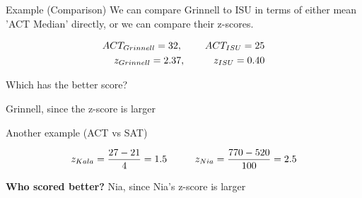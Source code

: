\documentclass{beamer}
\begin{document}
\begin{frame}{Example (Comparison)}
We can compare Grinnell to ISU in terms of either mean 'ACT Median' directly, or we can compare their z-scores.

\begin{center}
\begin{align*}
ACT_{Grinnell} = 32, \hspace{8mm} ACT_{ISU} = 25\\
z_{Grinnell} = 2.37, \hspace{10mm} z_{ISU} = 0.40
\end{align*} 
\end{center}
Which has the better score? 

Grinnell, since the z-score is larger
\end{frame}



\begin{frame}{Another example (ACT vs SAT)}

\noindent{} \vspace{4mm}

\begin{equation*}
    z_{Kala}=\frac{27-21}{4} = 1.5 \hspace{10mm} z_{Nia} = \frac{770-520}{100} = 2.5
\end{equation*} \vspace{4mm}

\textbf{Who scored better?} Nia, since Nia's z-score is larger
\end{frame}
\end{document}
